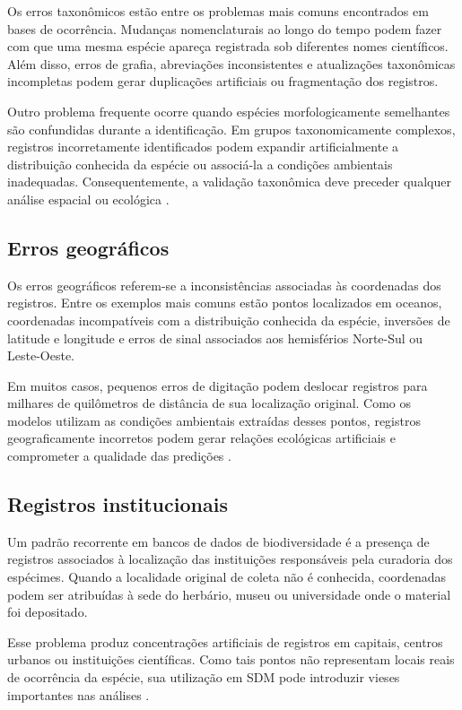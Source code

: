 Os erros taxonômicos estão entre os problemas mais comuns encontrados em bases de ocorrência. Mudanças nomenclaturais ao longo do tempo podem fazer com que uma mesma espécie apareça registrada sob diferentes nomes científicos. Além disso, erros de grafia, abreviações inconsistentes e atualizações taxonômicas incompletas podem gerar duplicações artificiais ou fragmentação dos registros.

Outro problema frequente ocorre quando espécies morfologicamente semelhantes são confundidas durante a identificação. Em grupos taxonomicamente complexos, registros incorretamente identificados podem expandir artificialmente a distribuição conhecida da espécie ou associá-la a condições ambientais inadequadas. Consequentemente, a validação taxonômica deve preceder qualquer análise espacial ou ecológica \parencite{guisan2017habitat}.

\subsection{Erros geográficos}

Os erros geográficos referem-se a inconsistências associadas às coordenadas dos registros. Entre os exemplos mais comuns estão pontos localizados em oceanos, coordenadas incompatíveis com a distribuição conhecida da espécie, inversões de latitude e longitude e erros de sinal associados aos hemisférios Norte-Sul ou Leste-Oeste.

Em muitos casos, pequenos erros de digitação podem deslocar registros para milhares de quilômetros de distância de sua localização original. Como os modelos utilizam as condições ambientais extraídas desses pontos, registros geograficamente incorretos podem gerar relações ecológicas artificiais e comprometer a qualidade das predições \parencite{franklin2010mapping}.

\subsection{Registros institucionais}

Um padrão recorrente em bancos de dados de biodiversidade é a presença de registros associados à localização das instituições responsáveis pela curadoria dos espécimes. Quando a localidade original de coleta não é conhecida, coordenadas podem ser atribuídas à sede do herbário, museu ou universidade onde o material foi depositado.

Esse problema produz concentrações artificiais de registros em capitais, centros urbanos ou instituições científicas. Como tais pontos não representam locais reais de ocorrência da espécie, sua utilização em SDM pode introduzir vieses importantes nas análises \parencite{zizka2019coordinatecleaner}.

